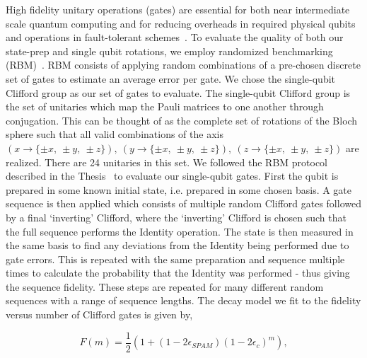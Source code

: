 \documentclass[12pt]{report}
\begin{document}
    High fidelity unitary operations (gates) are essential for both near
    intermediate scale quantum computing and for reducing overheads in required
    physical qubits and operations in fault-tolerant
    schemes~\cite{steane_overhead_2003}. To evaluate the quality of both our
    state-prep and single qubit rotations, we employ randomized benchmarking
    (RBM)~\cite{knill_randomized_2008, magesan_scalable_2011}.  RBM consists of
    applying random combinations of a pre-chosen discrete set of gates to
    estimate an average error per gate.  We chose the single-qubit Clifford
    group as our set of gates to evaluate. The single-qubit Clifford group is
    the set of unitaries which map the Pauli matrices to one another through
    conjugation. This can be thought of as the complete set of rotations of the
    Bloch sphere such that all valid combinations of the axis $(x \rightarrow
    \{\pm x,~\pm y,~\pm z\}),~(y \rightarrow \{\pm x,~\pm y,~\pm z\}),~(z
    \rightarrow \{\pm x,~\pm y,~\pm z\})$ are realized. There are 24 unitaries
    in this set. We followed the RBM protocol described in the
    Thesis~\cite{hughes_benchmarking_2021} to evaluate our single-qubit gates.
    First the qubit is prepared in some known initial state, i.e. prepared in
    some chosen basis. A gate sequence is then applied which consists of
    multiple random Clifford gates followed by a final `inverting' Clifford,
    where the `inverting' Clifford is chosen such that the full sequence
    performs the Identity operation. The state is then measured in the same
    basis to find any deviations from the Identity being performed due to gate
    errors. This is repeated with the same preparation and sequence multiple
    times to calculate the probability that the Identity was performed - thus
    giving the sequence fidelity. These steps are repeated for many different
    random sequences with a range of sequence lengths. The decay model we fit to
    the fidelity versus number of Clifford gates is given by,

    \begin{equation}
        F(m) = \frac{1}{2}\left( 1+(1-2\epsilon_{SPAM})(1-2\epsilon_c)^m\right),
    \end{equation}
\end{document}
